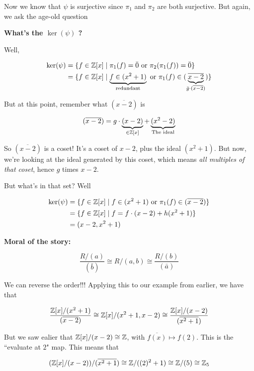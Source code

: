 \documentclass[12pt]{article}
\begin{document}
Now we know that $\psi$ is surjective since $\pi_1$ and $\pi_2$ are both
surjective. But again, we ask the age-old question

{\bf What's the $\ker(\psi)$ ?}

Well,

\begin{align*}
  \ker(\psi) &= \{f \in {\mathbb Z}[x] \mid \pi_1 (f) = \bar 0 \text{ or } \pi_2(\pi_1(f)) = \bar 0 \} \\
             &= \{f \in {\mathbb Z}[x] \mid \underbrace{f \in (x^2 + 1)}_{\text{redundant}} \text{ or } \pi_1(f) \in (\underbrace{\overline{x - 2}}_{\bar g \cdot (\overline{x - 2})})\}
\end{align*}

But at this point, remember what $(\overline{x - 2})$ is

\[
  (\overline{x - 2}) = g \cdot \underbrace{(x - 2)}_{\in {\mathbb Z}[x]} + \underbrace{(x^2 - 2)}_{\text{The ideal}}
\]

So $(\overline{x - 2})$ is a coset! It's a coset of $x - 2$, plus the ideal
$(x^2 + 1)$. But now, we're looking at the ideal generated by this coset, which
means {\it all multiples of that coset}, hence $g$ times $x - 2$.

But what's in that set? Well

\begin{align*}
  \ker(\psi) &= \{f \in {\mathbb Z}[x] \mid f \in (x^2 + 1) \text{ or } \pi_1(f) \in (\overline{x - 2})\} \\
             &= \{f \in {\mathbb Z}[x] \mid f = f \cdot (x - 2) + h (x^2 + 1) \} \\
             &= (x - 2, x^2 + 1)
\end{align*}

{\bf Moral of the story:}

\[
  \frac{R / (a)}{(\bar b)} \cong R / (a, b) \cong \frac{R / (b)}{(\bar a)}
\]

We can reverse the order!!! Applying this to our example from earlier, we have
that 

\[
  \frac{{\mathbb Z}[x] / (x^2 + 1)}{(\overline{x - 2})} \cong {\mathbb Z}[x] / (x^2 + 1, x - 2)
  \cong \frac{{\mathbb Z}[x] / (x - 2)}{(\overline{x^2 + 1})}
\]

But we saw ealier that ${\mathbb Z}[x] / (x - 2) \cong {\mathbb Z}$, with $\overline{f(x)} \mapsto
f(2)$. This is the ``evaluate at $2$" map. This means that

\[
  ({\mathbb Z}[x] / (x - 2)) / (\overline{x^2 + 1}) \cong {\mathbb Z} / ((2)^2 + 1) \cong {\mathbb Z} / (5)
  \cong {\mathbb Z}_5
\]
\end{document}
